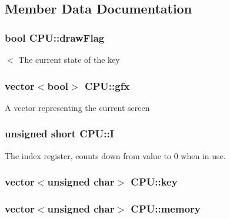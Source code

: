 \subsection{Member Data Documentation}
\hypertarget{classCPU_adccd58a3784f03ab908982b072139c1a}{
\subsubsection[{draw\-Flag}]{\setlength{\rightskip}{0pt plus 5cm}bool C\-P\-U\-::draw\-Flag\hspace{0.3cm}{\ttfamily [private]}}}\label{classCPU_adccd58a3784f03ab908982b072139c1a}
$<$ The current state of the key \hypertarget{classCPU_af5dd2f68fb212c8c39fad8522536c8aa}{
\subsubsection[{gfx}]{\setlength{\rightskip}{0pt plus 5cm}vector$<$bool$>$ C\-P\-U\-::gfx\hspace{0.3cm}{\ttfamily [private]}}}\label{classCPU_af5dd2f68fb212c8c39fad8522536c8aa}
A vector representing the current screen \hypertarget{classCPU_adf1fd15edb984e81a9f7adda264aa77a}{
\subsubsection[{I}]{\setlength{\rightskip}{0pt plus 5cm}unsigned short C\-P\-U\-::\-I\hspace{0.3cm}{\ttfamily [private]}}}\label{classCPU_adf1fd15edb984e81a9f7adda264aa77a}
The index register, counts down from value to 0 when in use. \hypertarget{classCPU_a043e3d085471f4edd7dded7d6b5c399f}{
\subsubsection[{key}]{\setlength{\rightskip}{0pt plus 5cm}vector$<$unsigned char$>$ C\-P\-U\-::key\hspace{0.3cm}{\ttfamily [private]}}}\label{classCPU_a043e3d085471f4edd7dded7d6b5c399f}
\hypertarget{classCPU_ab3122e590fe92912f56e1dc5192b9a39}{
\subsubsection[{memory}]{\setlength{\rightskip}{0pt plus 5cm}vector$<$unsigned char$>$ C\-P\-U\-::memory\hspace{0.3cm}{\ttfamily [private]}}}\label{classCPU_ab3122e590fe92912f56e1dc5192b9a39}

